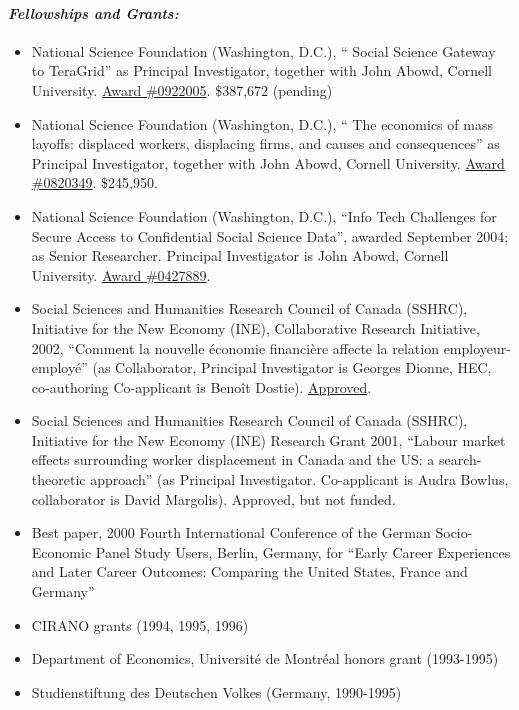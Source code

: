 \documentclass[10pt,letterpaper]{report}
\begin{document}
\paragraph{\it \bf Fellowships and Grants:}
\begin{itemize}
\item National Science Foundation (Washington, D.C.),  `` Social Science Gateway to TeraGrid''
  as Principal Investigator, together with  John Abowd, Cornell
  University.
  \href{http://www.nsf.gov/awardsearch/showAward.do?AwardNumber=0922005}{Award \#0922005}. \$387,672 (pending)
\item National Science Foundation (Washington, D.C.),  `` The economics of mass layoffs: displaced workers, displacing firms, and causes and consequences''
  as Principal Investigator, together with  John Abowd, Cornell
  University. \href{http://www.nsf.gov/awardsearch/showAward.do?AwardNumber=0820349}{Award \#0820349}.  \$245,950.
\item National Science Foundation (Washington, D.C.),  ``Info
  Tech Challenges for Secure Access to Confidential Social Science Data'',
  awarded September 2004; as Senior Researcher. Principal Investigator is John Abowd, Cornell
  University.   \href{http://www.nsf.gov/awardsearch/showAward.do?AwardNumber=0427889}{Award \#0427889}.
\item Social Sciences and Humanities Research Council of Canada (SSHRC), Initiative
  for the New Economy (INE), Collaborative Research Initiative, 2002,
  ``Comment la nouvelle \'economie financi\`ere affecte la relation employeur-employ\'e'' (as Collaborator,
  Principal Investigator is Georges Dionne, HEC, co-authoring Co-applicant
  is Beno\^it Dostie). \href{http://www.hec.ca/gestiondesrisques/ine.PDF}{Approved}. 
\item Social Sciences and Humanities Research Council of Canada (SSHRC), Initiative
  for the New Economy (INE) Research Grant 2001, ``Labour market effects
  surrounding worker displacement in Canada and the US: a search-theoretic
  approach'' (as Principal Investigator. Co-applicant is Audra Bowlus,
  collaborator is  David Margolis). Approved, but not funded.
\item Best paper, 2000 Fourth International Conference
  of the German Socio-Economic Panel Study Users, Berlin, Germany, for ``Early Career Experiences and Later Career Outcomes: Comparing the
  United States, France and Germany''
  \item CIRANO grants (1994, 1995, 1996)
  \item Department of Economics, Universit\'e de Montr\'eal honors grant
  (1993-1995) 
  \item Studienstiftung des Deutschen Volkes (Germany, 1990-1995)
  \end{itemize}
\end{document}

